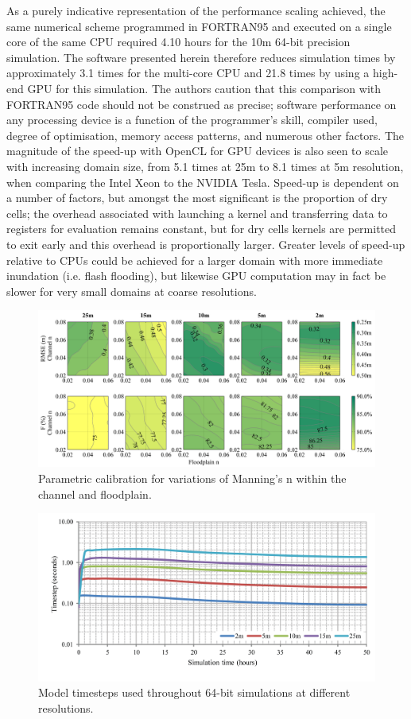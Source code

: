 \documentclass[11pt,english,a4paper]{article}
\begin{document}
As a purely indicative representation of the performance scaling achieved, the same numerical scheme programmed in FORTRAN95 and executed on a single core of the same CPU required 4.10 hours for the 10m 64-bit precision simulation. The software presented herein therefore reduces simulation times by approximately 3.1 times for the multi-core CPU and 21.8 times by using a high-end GPU for this simulation. The authors caution that this comparison with FORTRAN95 code should not be construed as precise; software performance on any processing device is a function of the programmer's skill, compiler used, degree of optimisation, memory access patterns, and numerous other factors. The magnitude of the speed-up with OpenCL for GPU devices is also seen to scale with increasing domain size, from 5.1 times at 25m to 8.1 times at 5m resolution, when comparing the Intel Xeon to the NVIDIA Tesla. Speed-up is dependent on a number of factors, but amongst the most significant is the proportion of dry cells; the overhead associated with launching a kernel and transferring data to registers for evaluation remains constant, but for dry cells kernels are permitted to exit early and this overhead is proportionally larger. Greater levels of speed-up relative to CPUs could be achieved for a larger domain with more immediate inundation (i.e. flash flooding), but likewise GPU computation may in fact be slower for very small domains at coarse resolutions.

\begin{figure}[tpb]
\centering
\includegraphics[width=1.0\textwidth]{Figure7.png}
\caption{Parametric calibration for variations of Manning’s n within the channel and floodplain.}
\label{Calibration}
\end{figure}
\begin{figure}[tpb]
\centering
\includegraphics[width=1.0\textwidth]{Figure8.png}
\caption{Model timesteps used throughout 64-bit simulations at different resolutions.}
\label{Timesteps}
\end{figure}
\end{document}
